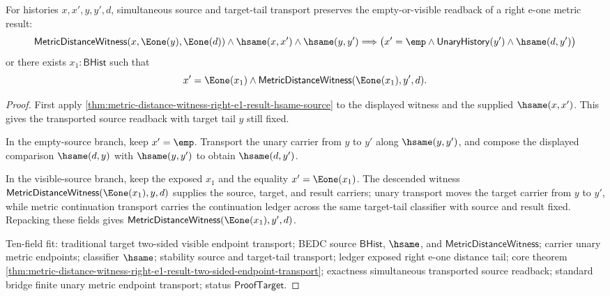 \begin{theorem}
\label{thm:metric-distance-witness-right-e1-result-two-sided-endpoint-transport}
For histories $x,x',y,y',d$, simultaneous source and target-tail transport
preserves the empty-or-visible readback of a right e-one metric result:
$$
\mathsf{MetricDistanceWitness}(x,\Eone(y),\Eone(d))\land
\hsame(x,x')\land\hsame(y,y')
\Longrightarrow
\bigl(x'=\emp\land\mathsf{UnaryHistory}(y')\land\hsame(d,y')\bigr)
$$
or there exists $x_1:\mathsf{BHist}$ such that
$$
x'=\Eone(x_1)\land\mathsf{MetricDistanceWitness}(\Eone(x_1),y',d).
$$
\end{theorem}
\begin{proof}
First apply
\autoref{thm:metric-distance-witness-right-e1-result-hsame-source} to the
displayed witness and the supplied $\hsame(x,x')$. This gives the transported
source readback with target tail $y$ still fixed.

In the empty-source branch, keep $x'=\emp$. Transport the unary carrier from
$y$ to $y'$ along $\hsame(y,y')$, and compose the displayed comparison
$\hsame(d,y)$ with $\hsame(y,y')$ to obtain $\hsame(d,y')$.

In the visible-source branch, keep the exposed $x_1$ and the equality
$x'=\Eone(x_1)$. The descended witness
$\mathsf{MetricDistanceWitness}(\Eone(x_1),y,d)$ supplies the source, target,
and result carriers; unary transport moves the target carrier from $y$ to
$y'$, while metric continuation transport carries the continuation ledger
across the same target-tail classifier with source and result fixed. Repacking
these fields gives
$\mathsf{MetricDistanceWitness}(\Eone(x_1),y',d)$.

Ten-field fit: traditional target two-sided visible endpoint transport; BEDC
source $\mathsf{BHist}$, $\hsame$, and $\mathsf{MetricDistanceWitness}$;
carrier unary metric endpoints; classifier $\hsame$; stability source and
target-tail transport; ledger exposed right e-one distance tail; core theorem
\autoref{thm:metric-distance-witness-right-e1-result-two-sided-endpoint-transport};
exactness simultaneous transported source readback; standard bridge finite
unary metric endpoint transport; status $\mathsf{ProofTarget}$.
\end{proof}

